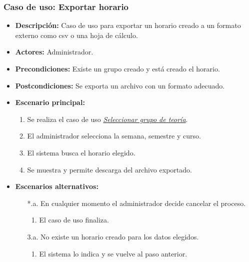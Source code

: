 \documentclass{book}
\begin{document}
\subsubsection*{Caso de uso: Exportar horario}
\begin{itemize}
\item{\bf Descripción:} Caso de uso para exportar un horario creado a un formato externo como csv o una hoja de cálculo.
\item{\bf Actores:} Administrador.
\item{\bf Precondiciones:} Existe un grupo creado y está creado el horario.
\item{\bf Postcondiciones:} Se exporta un archivo con un formato adecuado.
\item{\bf Escenario principal:}
	\begin{enumerate}
	\item Se realiza el caso de uso {\em \hyperref[select_grupo]{Seleccionar grupo de teoría}}.
	\item El administrador selecciona la semana, semestre y curso.
	\item El sistema busca el horario elegido.
	\item Se muestra y permite descarga del archivo exportado.
	\end{enumerate}
\item{\bf Escenarios alternativos:}
	\begin{itemize}
		\item[*.a.] En cualquier momento el administrador decide cancelar el proceso.
		\begin{enumerate}
			\item El caso de uso finaliza.
		\end{enumerate}
		\item[3.a.] No existe un horario creado para los datos elegidos.
		\begin{enumerate}
			\item El sistema lo indica y se vuelve al paso anterior.
		\end{enumerate}
	\end{itemize}
\end{itemize}
\end{document}
